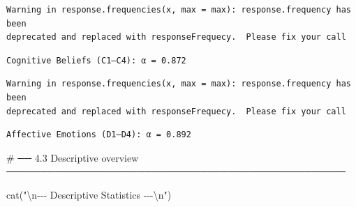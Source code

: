 \documentclass[
  letterpaper,
  DIV=11,
  numbers=noendperiod]{scrartcl}
\newenvironment{Shaded}{\begin{snugshade}}{\end{snugshade}}
\newcommand{\AttributeTok}[1]{\textcolor[rgb]{0.40,0.45,0.13}{#1}}
\newcommand{\CommentTok}[1]{\textcolor[rgb]{0.37,0.37,0.37}{#1}}
\newcommand{\ConstantTok}[1]{\textcolor[rgb]{0.56,0.35,0.01}{#1}}
\newcommand{\DecValTok}[1]{\textcolor[rgb]{0.68,0.00,0.00}{#1}}
\newcommand{\FunctionTok}[1]{\textcolor[rgb]{0.28,0.35,0.67}{#1}}
\newcommand{\NormalTok}[1]{\textcolor[rgb]{0.00,0.23,0.31}{#1}}
\newcommand{\SpecialCharTok}[1]{\textcolor[rgb]{0.37,0.37,0.37}{#1}}
\newcommand{\StringTok}[1]{\textcolor[rgb]{0.13,0.47,0.30}{#1}}
\begin{document}
\begin{Shaded}
\end{Shaded}

\begin{verbatim}
Warning in response.frequencies(x, max = max): response.frequency has been
deprecated and replaced with responseFrequecy.  Please fix your call
\end{verbatim}

\begin{verbatim}
Cognitive Beliefs (C1–C4): α = 0.872 
\end{verbatim}

\begin{Shaded}
\end{Shaded}

\begin{verbatim}
Warning in response.frequencies(x, max = max): response.frequency has been
deprecated and replaced with responseFrequecy.  Please fix your call
\end{verbatim}

\begin{verbatim}
Affective Emotions (D1–D4): α = 0.892 
\end{verbatim}

\begin{Shaded}
\begin{Highlighting}[]
\CommentTok{\# ── 4.3  Descriptive overview ─────────────────────────────────────────────────}

\FunctionTok{cat}\NormalTok{(}\StringTok{"}\SpecialCharTok{\textbackslash{}n}\StringTok{{-}{-}{-} Descriptive Statistics {-}{-}{-}}\SpecialCharTok{\textbackslash{}n}\StringTok{"}\NormalTok{)}
\end{Highlighting}
\end{Shaded}
\end{document}
